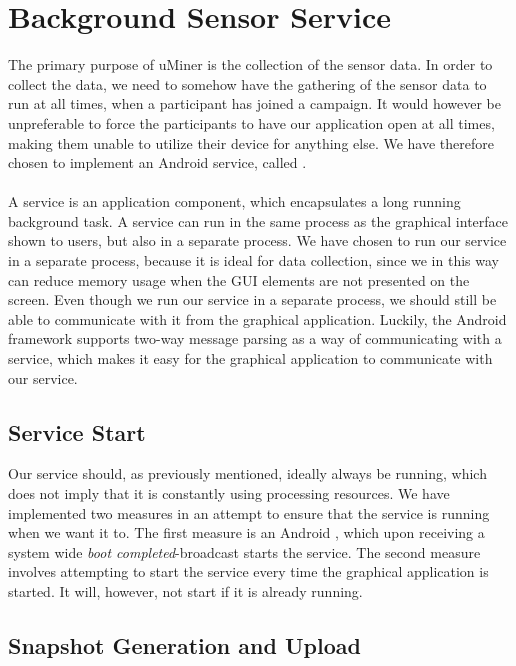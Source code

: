 
\section{Background Sensor Service}
\label{sec:background_sensor_service}

The primary purpose of uMiner is the collection of the sensor data. In order to collect the data, we need to somehow have the gathering of the sensor data to run at all times, when a participant has joined a campaign. It would however be unpreferable to force the participants to have our application open at all times, making them unable to utilize their device for anything else. We have therefore chosen to implement an Android service, called . 
\\\\
A service is an application component, which encapsulates a long running background task. A service can run in the same process as the graphical interface shown to users, but also in a separate process. We have chosen to run our service in a separate process, because it is ideal for data collection, since we in this way can reduce memory usage when the GUI elements are not presented on the screen. Even though we run our service in a separate process, we should still be able to communicate with it from the graphical application. Luckily, the Android framework supports two-way message parsing as a way of communicating with a service, which makes it easy for the graphical application to communicate with our service.

\subsection{Service Start}
\label{sub:service_start}
Our service should, as previously mentioned, ideally always be running, which does not imply that it is constantly using processing resources. We have implemented two measures in an attempt to ensure that the service is running when we want it to. The first measure is an Android , which upon receiving a system wide \emph{boot completed}-broadcast starts the service. The second measure involves attempting to start the service every time the graphical application is started. It will, however, not start if it is already running.

\subsection{Snapshot Generation and Upload}
\label{sub:background_sensor_service_snapshot_generation_and_upload}

